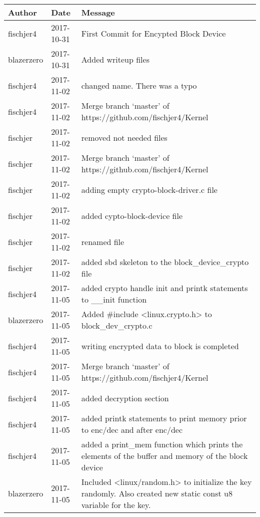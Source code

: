 \documentclass[draftclsnofoot, onecolumn, 10pt, compsoc]{IEEEtran}
\begin{document}
\begin{center}
	\begin{longtabu} to \textwidth {| X[4,l] | X[3,c] | X[8,l] |}
		\hline
		\textbf{Author} & \textbf{Date} & \textbf{Message} \\ \hline
		fischjer4 & 2017-10-31 & First Commit for Encypted Block Device \\ \hline
		blazerzero & 2017-10-31 & Added writeup files \\ \hline
		fischjer4 & 2017-11-02 & changed name. There was a typo \\ \hline
		fischjer4 & 2017-11-02 & Merge branch `master' of https://github.com/fischjer4/Kernel \\ \hline
		fischjer & 2017-11-02 & removed not needed files \\ \hline
		fischjer & 2017-11-02 & Merge branch `master' of https://github.com/fischjer4/Kernel \\ \hline
		fischjer & 2017-11-02 & adding empty crypto-block-driver.c file \\ \hline
		fischjer & 2017-11-02 & added cypto-block-device file \\ \hline
		fischjer & 2017-11-02 & renamed file \\ \hline
		fischjer & 2017-11-02 & added sbd skeleton to the block\_device\_crypto file \\ \hline
		fischjer4 & 2017-11-05 & added crypto handle init and printk statements to \_\_init function \\ \hline
		blazerzero & 2017-11-05 & Added \#include \textless{}linux.crypto.h\textgreater{} to block\_dev\_crypto.c \\ \hline
		fischjer4 & 2017-11-05 & writing encrypted data to block is completed \\ \hline
		fischjer4 & 2017-11-05 & Merge branch `master' of https://github.com/fischjer4/Kernel \\ \hline
		fischjer4 & 2017-11-05 & added decryption section \\ \hline
		fischjer4 & 2017-11-05 & added printk statements to print memory prior to enc/dec and after enc/dec \\ \hline
		fischjer4 & 2017-11-05 & added a print\_mem function which prints the elements of the buffer and memory of the block device \\ \hline
		blazerzero & 2017-11-05 & Included \textless{}linux/random.h\textgreater{} to initialize the key randomly. Also created new static const u8 variable for the key. \\ \hline

\end{longtabu}
\end{center}
\end{document}
